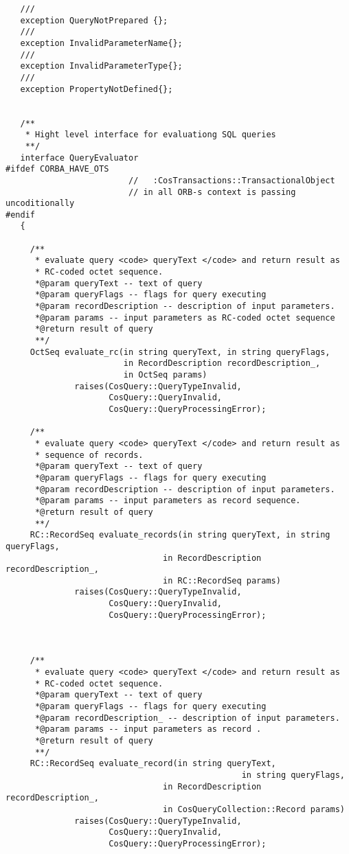 \documentclass[10pt]{article}
\begin{document}
\begin{verbatim}
   ///
   exception QueryNotPrepared {};
   ///
   exception InvalidParameterName{};
   ///
   exception InvalidParameterType{};
   ///
   exception PropertyNotDefined{};


   /**
    * Hight level interface for evaluationg SQL queries
    **/
   interface QueryEvaluator
#ifdef CORBA_HAVE_OTS
                         //   :CosTransactions::TransactionalObject
                         // in all ORB-s context is passing uncoditionally 
#endif
   {

     /**
      * evaluate query <code> queryText </code> and return result as
      * RC-coded octet sequence.
      *@param queryText -- text of query
      *@param queryFlags -- flags for query executing
      *@param recordDescription -- description of input parameters.
      *@param params -- input parameters as RC-coded octet sequence
      *@return result of query
      **/
     OctSeq evaluate_rc(in string queryText, in string queryFlags,
                        in RecordDescription recordDescription_,
                        in OctSeq params)
              raises(CosQuery::QueryTypeInvalid,
                     CosQuery::QueryInvalid,
                     CosQuery::QueryProcessingError);

     /**
      * evaluate query <code> queryText </code> and return result as
      * sequence of records.
      *@param queryText -- text of query
      *@param queryFlags -- flags for query executing
      *@param recordDescription -- description of input parameters.
      *@param params -- input parameters as record sequence.
      *@return result of query
      **/
     RC::RecordSeq evaluate_records(in string queryText, in string queryFlags,
                                in RecordDescription recordDescription_,
                                in RC::RecordSeq params)
              raises(CosQuery::QueryTypeInvalid,
                     CosQuery::QueryInvalid,
                     CosQuery::QueryProcessingError);



     /**
      * evaluate query <code> queryText </code> and return result as
      * RC-coded octet sequence.
      *@param queryText -- text of query
      *@param queryFlags -- flags for query executing
      *@param recordDescription_ -- description of input parameters.
      *@param params -- input parameters as record .
      *@return result of query
      **/
     RC::RecordSeq evaluate_record(in string queryText,
                                                in string queryFlags,
                                in RecordDescription recordDescription_,
                                in CosQueryCollection::Record params)
              raises(CosQuery::QueryTypeInvalid,
                     CosQuery::QueryInvalid,
                     CosQuery::QueryProcessingError);



\end{verbatim}
\end{document}
